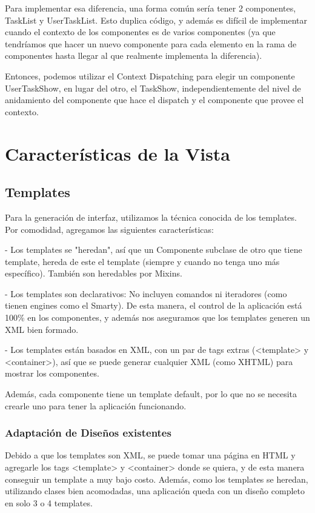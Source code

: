 Para implementar esa diferencia, una forma común sería tener 2 componentes, TaskList y UserTaskList. Esto duplica código, y además es difícil de
implementar cuando el contexto de los componentes es de varios componentes (ya que tendríamos que hacer un nuevo componente para cada elemento en
la rama de componentes hasta llegar al que realmente implementa la diferencia).

Entonces, podemos utilizar el Context Dispatching para elegir un componente UserTaskShow, en lugar del otro, el TaskShow, independientemente del nivel de
anidamiento del componente que hace el dispatch y el componente que provee el contexto.


\section{Características de la Vista}

\subsection{Templates}
\label{sub-templates}
Para la generación de interfaz, utilizamos la técnica conocida de los templates.
Por comodidad, agregamos las siguientes características:

- Los templates se "heredan", así que un Componente subclase de otro que tiene template, hereda de este el
template (siempre y cuando no tenga uno más específico). También son heredables por Mixins.

- Los templates son declarativos: No incluyen comandos ni iteradores (como tienen engines como el Smarty).
De esta manera, el control de la aplicación está 100\% en los componentes, y además nos aseguramos que los
templates generen un XML bien formado.

- Los templates están basados en XML, con un par de tags extras (<template> y <container>), así que se puede
generar cualquier XML (como XHTML) para mostrar los componentes.

Además, cada componente tiene un template default, por lo que no se necesita crearle uno para tener la aplicación
funcionando.

\subsubsection{Adaptación de Diseños existentes}
\label{sub-templates-adapt}
Debido a que los templates son XML, se puede tomar una página en HTML y agregarle los tags <template> y <container> donde
se quiera, y de esta manera conseguir un template a muy bajo costo.
Además, como los templates se heredan, utilizando clases bien acomodadas, una aplicación queda con un diseño completo en
solo 3 o 4 templates.


